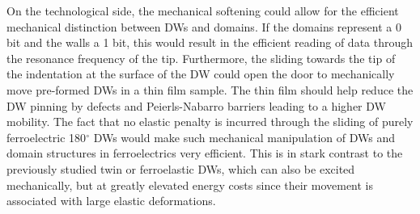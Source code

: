 On the technological side, the mechanical softening could allow for the efficient mechanical distinction between \glspl{DW} and domains. If the domains represent a 0 bit and the walls a 1 bit, this would result in the efficient reading of data through the resonance frequency of the tip.
Furthermore, the sliding towards the tip of the indentation at the surface of the \gls{DW} could open the door to mechanically move pre-formed \glspl{DW} in a thin film sample.
The thin film should help reduce the \gls{DW} pinning by defects and Peierls-Nabarro barriers leading to a higher \gls{DW} mobility.
The fact that no elastic penalty is incurred through the sliding of purely ferroelectric 180$^\circ$ \glspl{DW} would make such mechanical manipulation of \glspl{DW} and domain structures in ferroelectrics very efficient.
This is in stark contrast to the previously studied twin or ferroelastic \glspl{DW}, which can also be excited mechanically, but at greatly elevated energy costs since their movement is associated with large elastic deformations.
